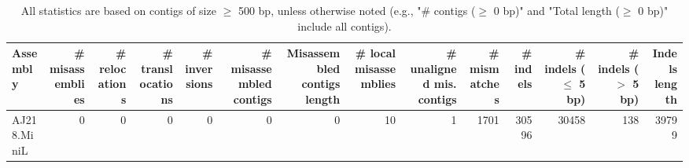 \documentclass[12pt,a4paper]{article}
\begin{document}
\begin{table}[ht]
\begin{center}
\caption{All statistics are based on contigs of size $\geq$ 500 bp, unless otherwise noted (e.g., "\# contigs ($\geq$ 0 bp)" and "Total length ($\geq$ 0 bp)" include all contigs).}
\begin{tabular}{|l*{13}{|r}|}
\hline
Assembly & \# misassemblies &     \# relocations &     \# translocations &     \# inversions & \# misassembled contigs & Misassembled contigs length & \# local misassemblies & \# unaligned mis. contigs & \# mismatches & \# indels &     \# indels ($\leq$ 5 bp) &     \# indels ($>$ 5 bp) & Indels length \\ \hline
AJ218.MiniL & 0 & 0 & 0 & 0 & 0 & 0 & 10 & 1 & 1701 & 30596 & 30458 & 138 & 39799 \\ \hline
\end{tabular}
\end{center}
\end{table}
\end{document}
